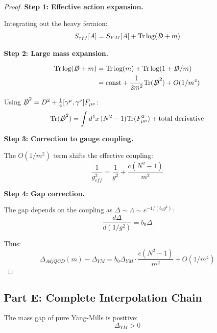 \begin{proof}
\textbf{Step 1: Effective action expansion.}

Integrating out the heavy fermion:
\begin{equation}
S_{eff}[A] = S_{YM}[A] + \mathrm{Tr}\log(\slashed{D} + m)
\end{equation}

\textbf{Step 2: Large mass expansion.}

\begin{align}
\mathrm{Tr}\log(\slashed{D} + m) &= \mathrm{Tr}\log(m) + \mathrm{Tr}\log(1 + \slashed{D}/m) \\
&= \text{const} + \frac{1}{2m^2}\mathrm{Tr}(\slashed{D}^2) + O(1/m^4)
\end{align}

Using $\slashed{D}^2 = D^2 + \frac{1}{4}[\gamma^\mu, \gamma^\nu]F_{\mu\nu}$:
\begin{equation}
\mathrm{Tr}(\slashed{D}^2) = \int d^4x \, (N^2-1) \mathrm{Tr}(F_{\mu\nu}^2) + \text{total derivative}
\end{equation}

\textbf{Step 3: Correction to gauge coupling.}

The $O(1/m^2)$ term shifts the effective coupling:
\begin{equation}
\frac{1}{g_{eff}^2} = \frac{1}{g^2} + \frac{c(N^2-1)}{m^2}
\end{equation}

\textbf{Step 4: Gap correction.}

The gap depends on the coupling as $\Delta \sim \Lambda \sim e^{-1/(b_0 g^2)}$:
\begin{equation}
\frac{d\Delta}{d(1/g^2)} = b_0 \Delta
\end{equation}

Thus:
\begin{equation}
\Delta_{AdjQCD}(m) - \Delta_{YM} = b_0 \Delta_{YM} \cdot \frac{c(N^2-1)}{m^2} + O(1/m^4)
\end{equation}
\end{proof}

\subsection{Part E: Complete Interpolation Chain}

\begin{theorem}
\label{thm:adjoint-complete}
The mass gap of pure Yang-Mills is positive:
\begin{equation}
\boxed{\Delta_{YM} > 0}
\end{equation}
\end{theorem}

